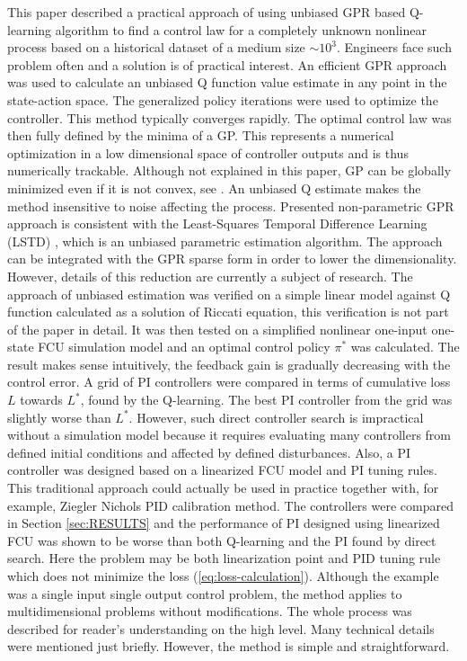 \documentclass{ifacconf}
\begin{document}
This paper described a practical approach of using unbiased GPR based
Q-learning algorithm to find a control law for a completely unknown
nonlinear process based on a historical dataset of a medium size $\sim10^{3}$.
Engineers face such problem often and a solution is of practical interest.
An efficient GPR approach was used to calculate an unbiased Q function
value estimate in any point in the state-action space. The generalized policy
iterations were used to optimize the controller. This method typically
converges rapidly. The optimal control law was then fully defined
by the minima of a GP. This represents a numerical optimization in
a low dimensional space of controller outputs and is thus numerically
trackable. Although not explained in this paper, GP can be globally
minimized even if it is not convex, see \citep{ecc19ref:Franey_Branch_and_Bound_Algo}.
An unbiased Q estimate makes the method insensitive to noise affecting
the process. Presented non-parametric GPR approach is consistent with the Least-Squares Temporal
Difference Learning (LSTD) \citep{ecc19ref:Bratke_Linear_Least_Squares_Algo}, which is an unbiased parametric estimation algorithm. The approach can be integrated with the GPR sparse form
in order to lower the dimensionality. However, details of this reduction
are currently a subject of research. The approach of unbiased estimation
was verified on a simple linear model against Q function calculated
as a solution of Riccati equation, this verification is not part of
the paper in detail. It was then tested on a simplified nonlinear
one-input one-state FCU simulation model and an optimal control policy
$\pi^{*}$ was calculated. The result makes sense intuitively, the
feedback gain is gradually decreasing with the control error. A grid
of PI controllers were compared in terms of cumulative loss $L$ towards
$L^{*}$,  found by the Q-learning. The best PI controller from the
grid was slightly worse than $L^{*}$. However, such direct controller
search is impractical without a simulation model because it requires
evaluating many controllers from defined initial conditions and affected
by defined disturbances. Also, a PI controller was designed based
on a linearized FCU model and PI tuning rules. This traditional approach
could actually be used in practice together with, for example, Ziegler
Nichols PID calibration method. The controllers were compared in Section
\ref{sec:RESULTS} and the performance of PI designed using linearized
FCU was shown to be worse than both Q-learning and the PI found by
direct search. Here the problem may be both linearization point and
PID tuning rule which does not minimize the loss (\ref{eq:loss-calculation}).
Although the example was a single input single output control problem,
the method applies to multidimensional problems without modifications.
The whole process was described for reader's understanding on the
high level. Many technical details were mentioned just briefly. However,
the method is simple and straightforward.
\end{document}

